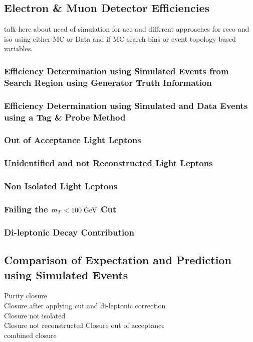 \subsection{Electron \& Muon Detector Efficiencies}
\label{sec:Lost_Lepton_8TeV_Efficiencies_Main}
\todo talk here about need of simulation for acc and different approaches for reco and iso using either MC or Data and if MC search bins or event topology based variables.
\subsubsection{Efficiency Determination using Simulated Events from Search Region using Generator Truth Information}
\label{sec:Lost_Lepton_8TeV_Efficiencies_Truth}
\subsubsection{Efficiency Determination using Simulated and Data Events using a Tag \& Probe Method}
\label{sec:Lost_Lepton_8TeV_Tag_Probe}

\subsubsection{Out of Acceptance Light Leptons}
\label{sec:Lost_Lepton_8TeV_Acc}

\subsubsection{Unidentified and not Reconstructed Light Leptons}
\label{sec:Lost_Lepton_8TeV_Reco}

\subsubsection{Non Isolated Light Leptons}
\label{sec:Lost_Lepton_8TeV_Iso}

\subsubsection{Failing the $m_{T}<100\;\text{Ge}\kern-0.06667em\text{V}$ Cut}
\label{sec:Lost_Lepton_8TeV_MTCut}

\subsubsection{Di-leptonic \ttbar Decay Contribution}
\label{sec:Lost_Lepton_8TeV_Di_Lep}


\subsection{Comparison of Expectation and Prediction using Simulated Events}
\label{sec:Lost_Lepton_8TeV_Closure}
\todo Purity closure\\
\todo Closure after applying \mt cut and di-leptonic correction\\
\todo Closure not isolated\\
\todo Closure not reconstructed
\todo Closure out of acceptance\\
\todo combined closure\\

